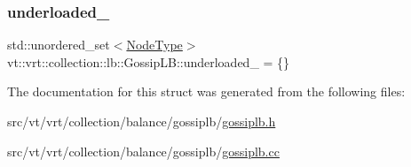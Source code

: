 \mbox{\label{structvt_1_1vrt_1_1collection_1_1lb_1_1_gossip_l_b_a446275a50d83148d702b293bdae89da4}} 
\subsubsection{\texorpdfstring{underloaded\+\_\+}{underloaded\_}}
{\footnotesize\ttfamily std\+::unordered\+\_\+set$<$\hyperlink{namespacevt_a866da9d0efc19c0a1ce79e9e492f47e2}{Node\+Type}$>$ vt\+::vrt\+::collection\+::lb\+::\+Gossip\+L\+B\+::underloaded\+\_\+ = \{\}\hspace{0.3cm}{\ttfamily [private]}}



The documentation for this struct was generated from the following files\+:\begin{DoxyCompactItemize}
\item 
src/vt/vrt/collection/balance/gossiplb/\hyperlink{gossiplb_8h}{gossiplb.\+h}\item 
src/vt/vrt/collection/balance/gossiplb/\hyperlink{gossiplb_8cc}{gossiplb.\+cc}\end{DoxyCompactItemize}
